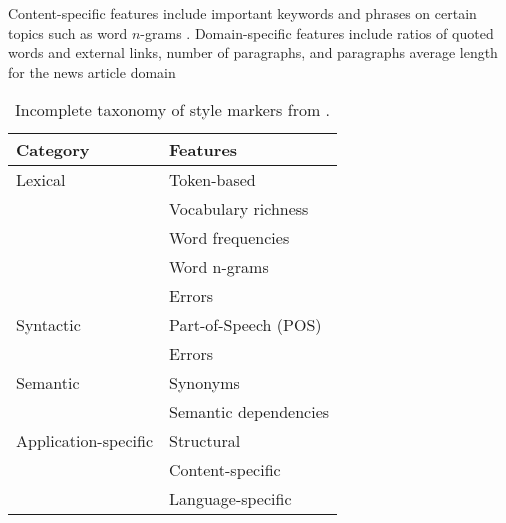 \begin{definition}
    Content-specific features include important keywords and phrases on certain topics such as word $n$-grams \citep{abbasi_writeprints_2008}.
    Domain-specific features include ratios of quoted words and external links, number of paragraphs, 
    and paragraphs average length for the news article domain \citep{potthast_stylometric_2018}
\end{definition}

\begin{table}[]
    \centering
    \caption{Incomplete taxonomy of style markers from \citep{stamatatos_survey_2009}.}
    \label{tab:stylometric_features}
 
    \begin{tabular}{@{}ll@{}} %
    \toprule
    \textbf{Category} & \textbf{Features} \\ 
    \midrule
    Lexical & Token-based \\ %
     & Vocabulary richness  \\
     & Word frequencies  \\
     & Word n-grams  \\
     & Errors \\
    Syntactic & Part-of-Speech (POS)  \\
     & Errors  \\
    Semantic & Synonyms \\
     & Semantic dependencies \\
    Application-specific & Structural  \\
     & Content-specific\\
     & Language-specific \\
     \bottomrule
    \end{tabular}%

\end{table}